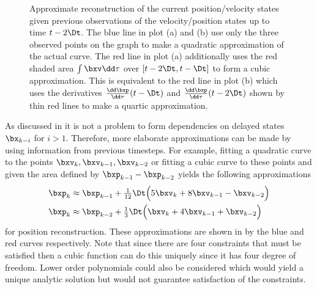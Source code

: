 \begin{figure}[t]
{
\label{fig:veldiff2}
}
%
\caption{Approximate reconstruction of the current position/velocity states given previous observations of the velocity/position states up to time $t-2\Dt$. The blue line in plot (a) and (b) use only the three observed points on the graph to make a quadratic approximation of the actual curve. The red line in plot (a) additionally uses the red shaded area $\int \bxv \dd\tau$ over $[t-2\Dt,t-\Dt]$ to form a cubic approximation. This is equivalent to the red line in plot (b) which uses the derivatives $\frac{\dd\bxp}{\dd \tau}(t-\Dt)$ and $\frac{\dd\bxp}{\dd \tau} (t-2\Dt)$ shown by thin red lines to make a quartic approximation.}
\label{fig:posvel2}
\end{figure}





As discussed in  it is not a problem to form dependencies on delayed states $\bx_{k-i}$ for $i >1$. Therefore, more elaborate approximations can be made by using information from previous timesteps. For example, fitting a quadratic curve to the points $\bxv_k, \bxv_{k-1}, \bxv_{k-2}$ or fitting a cubic curve to these points and given the area defined by $\bxp_{k-1} - \bxp_{k-2}$ yields the following approximations
\begin{align}
\bxp_{k} &\approx \bxp_{k-1} + \tfrac{1}{12}\Dt\Big( 5\bxv_k + 8\bxv_{k-1} - \bxv_{k-2} \Big) \label{eqn:dada} \\
\bxp_{k} &\approx \bxp_{k-2} + \tfrac{1}{3}\Dt\Big( \bxv_k + 4\bxv_{k-1} + \bxv_{k-2} \Big) \label{eqn:mama}
\end{align}
for position reconstruction. These approximations are shown in  by the blue and red curves respectively. Note that since there are four constraints that must be satisfied then a cubic function can do this uniquely since it has four degree of freedom. Lower order polynomials could also be considered which would yield a unique analytic solution but would not guarantee satisfaction of the constraints.

